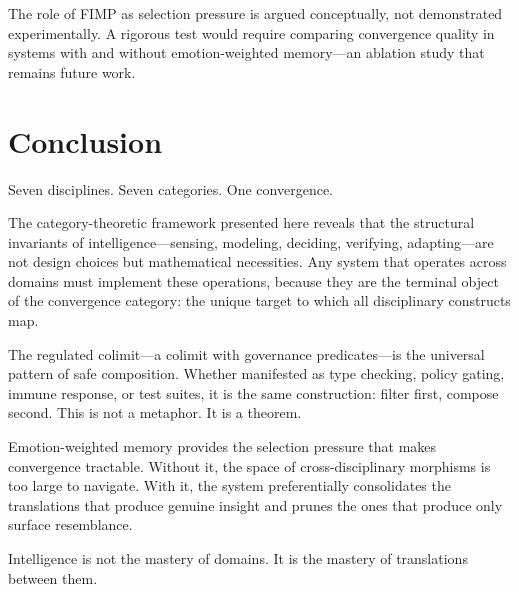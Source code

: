 \documentclass[11pt,a4paper]{article}
\begin{document}
The role of FIMP as selection pressure is argued conceptually, not demonstrated experimentally. A rigorous test would require comparing convergence quality in systems with and without emotion-weighted memory---an ablation study that remains future work.

\section{Conclusion}
\label{sec:conclusion}

Seven disciplines. Seven categories. One convergence.

The category-theoretic framework presented here reveals that the structural invariants of intelligence---sensing, modeling, deciding, verifying, adapting---are not design choices but mathematical necessities. Any system that operates across domains must implement these operations, because they are the terminal object of the convergence category: the unique target to which all disciplinary constructs map.

The regulated colimit---a colimit with governance predicates---is the universal pattern of safe composition. Whether manifested as type checking, policy gating, immune response, or test suites, it is the same construction: filter first, compose second. This is not a metaphor. It is a theorem.

Emotion-weighted memory provides the selection pressure that makes convergence tractable. Without it, the space of cross-disciplinary morphisms is too large to navigate. With it, the system preferentially consolidates the translations that produce genuine insight and prunes the ones that produce only surface resemblance.

Intelligence is not the mastery of domains. It is the mastery of translations between them.
\end{document}
